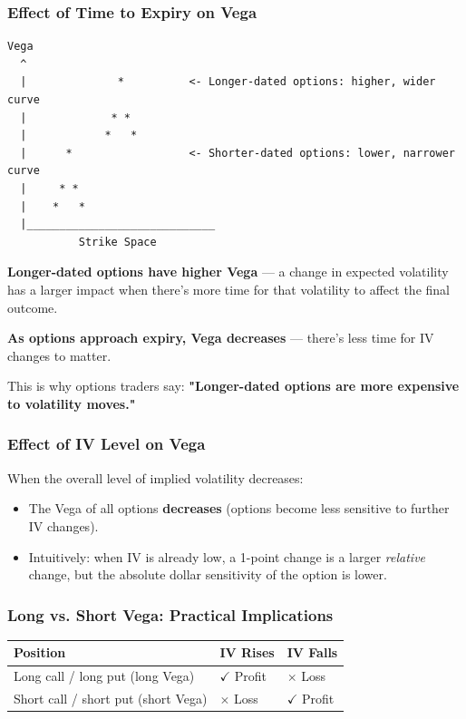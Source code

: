 \documentclass[12pt,openany]{book}
\begin{document}
\subsubsection{Effect of Time to Expiry on Vega}

\begin{center}
\begin{Verbatim}[fontsize=\small,breaklines=true]
Vega
  ^
  |              *          <- Longer-dated options: higher, wider curve
  |             * *
  |            *   *
  |      *                  <- Shorter-dated options: lower, narrower curve
  |     * *
  |    *   *
  |_____________________________
           Strike Space
\end{Verbatim}
\end{center}

\textbf{Longer-dated options have higher Vega} — a change in expected volatility has a larger impact when there's more time for that volatility to affect the final outcome.

\textbf{As options approach expiry, Vega decreases} — there's less time for IV changes to matter.

This is why options traders say: \textbf{"Longer-dated options are more expensive to volatility moves."}

\subsubsection{Effect of IV Level on Vega}

When the overall level of implied volatility decreases:
\begin{itemize}[leftmargin=*]
    \item The Vega of all options \textbf{decreases} (options become less sensitive to further IV changes).
    \item Intuitively: when IV is already low, a 1-point change is a larger \emph{relative} change, but the absolute dollar sensitivity of the option is lower.
\end{itemize}

\subsubsection{Long vs. Short Vega: Practical Implications}

\begin{center}
\scriptsize
\setlength{\tabcolsep}{3pt}
\begin{tabular}{|L{4.1cm}|L{4.1cm}|L{4.1cm}|}
\hline
\textbf{Position} & \textbf{IV Rises} & \textbf{IV Falls} \\
\hline
Long call / long put (long Vega) & \(\checkmark\) Profit & \(\times\) Loss \\
\hline
Short call / short put (short Vega) & \(\times\) Loss & \(\checkmark\) Profit \\
\hline
\end{tabular}
\end{center}
\end{document}

